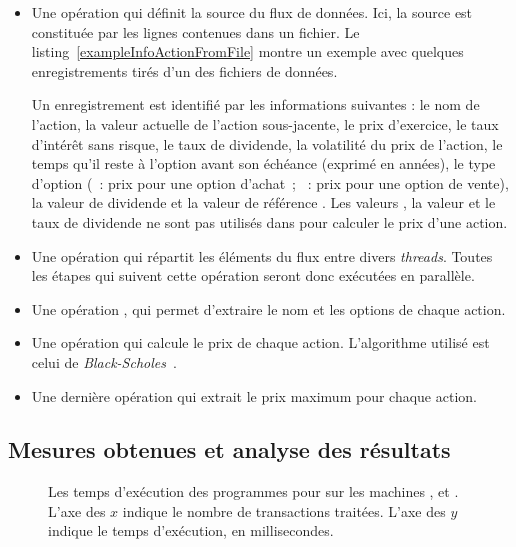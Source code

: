 \begin{itemize}

\item Une op\'eration qui d\'efinit la source du flux de donn\'ees. Ici, la source est constitu\'ee par les lignes contenues dans un fichier. Le listing~\ref{exampleInfoActionFromFile} montre un exemple avec quelques enregistrements tir\'es d'un des fichiers de données. 

Un enregistrement est identifi\'e par les informations suivantes : le nom de l'action, la valeur actuelle de l'action sous-jacente, le prix d'exercice, le taux d'int\'er\^et sans risque, le taux de dividende, la volatilit\'e du prix de l'action, le temps qu'il reste \`a l'option avant son \'ech\'eance (exprim\'e en ann\'ees), le type d'option (~: prix pour une option d'achat~; ~: prix pour une option de vente), la valeur de dividende et la valeur de r\'ef\'erence . 
Les valeurs , la valeur et le taux de dividende ne sont pas utilis\'es dans  pour calculer le prix d'une action.

\item Une op\'eration qui r\'epartit les \'el\'ements du flux entre divers \emph{threads}.
Toutes les \'etapes qui suivent cette op\'eration seront donc ex\'ecut\'ees en parall\`ele.

\item Une op\'eration  , qui permet d'extraire le nom et les options de chaque action.


\item  Une op\'eration qui calcule le prix de chaque action. L'algorithme utilis\'e est celui de \emph{Black-Scholes}~\citep{macbeth1979empirical}. 

\item Une derni\`ere op\'eration qui extrait le prix maximum pour chaque action.


\end{itemize}

\subsection{Mesures obtenues et analyse des r\'esultats}

\begin{figure}



\caption[Les temps d'exécution des programmes pour  sur
les machines ,  et .]{Les temps d'exécution des programmes
pour  sur les machines ,  et . L'axe des $x$
indique le nombre de transactions traitées. L'axe des $y$ indique le temps d'exécution, en millisecondes.}
\label{StockPrice-temps.fig}
\end{figure}


